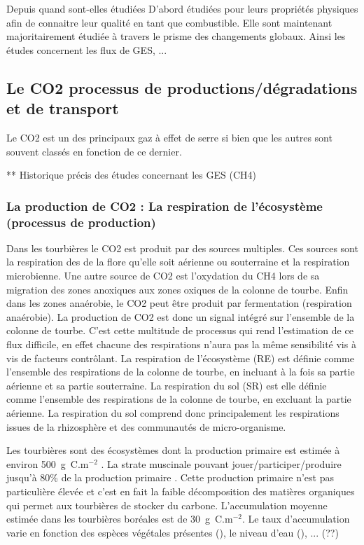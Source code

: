 Depuis quand sont-elles étudiées
D'abord étudiées pour leurs propriétés physiques afin de connaitre leur qualité en tant que combustible.
Elle sont maintenant majoritairement étudiée à travers le prisme des changements globaux.
Ainsi les études concernent les flux de GES, ...

\subsection{Le CO2 processus de productions/dégradations et de transport}
Le CO2 est un des principaux gaz à effet de serre si bien que les autres sont souvent classés en fonction de ce dernier.

** Historique précis des études concernant les GES (CH4)

\subsubsection{La production de CO2 : La respiration de l'écosystème (processus de production)}
Dans les tourbières le CO2 est produit par des sources multiples.
Ces sources sont la respiration des de la flore qu'elle soit aérienne ou souterraine et la respiration microbienne.
Une autre source de CO2 est l'oxydation du CH4 lors de sa migration des zones anoxiques aux zones oxiques de la colonne de tourbe.
Enfin dans les zones anaérobie, le CO2 peut être produit par fermentation (respiration anaérobie).
La production de CO2 est donc un signal intégré sur l'ensemble de la colonne de tourbe. 
C'est cette multitude de processus qui rend l'estimation de ce flux difficile, en effet chacune des respirations n'aura pas la même sensibilité vis à vis de facteurs contrôlant.
La respiration de l'écosystème (RE) est définie comme l'ensemble des respirations de la colonne de tourbe, en incluant à la fois sa partie aérienne et sa partie souterraine.
La respiration du sol (SR) est elle définie comme l'ensemble des respirations de la colonne de tourbe, en excluant la partie aérienne.
La respiration du sol comprend donc principalement les respirations issues de la rhizosphère et des communautés de micro-organisme.

Les tourbières sont des écosystèmes dont la production primaire est estimée à environ 500~g~C.m$^{-2}$ \cite{francez2000}. 
La strate muscinale pouvant jouer/participer/produire jusqu'à 80\% de la production primaire \cite{francez2000}.
Cette production primaire n'est pas particulière élevée \plop et c'est en fait la faible décomposition des matières organiques qui permet aux tourbières de stocker du carbone.
L'accumulation moyenne estimée dans les tourbières boréales est de 30~g~C.m$^{-2}$. Le taux d'accumulation varie en fonction des espèces végétales présentes (\plop), le niveau d'eau (\plop), ... (??)

